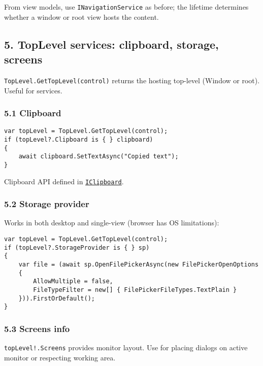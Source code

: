 From view models, use \passthrough{\lstinline!INavigationService!} as
before; the lifetime determines whether a window or root view hosts the
content.

\subsection{5. TopLevel services: clipboard, storage,
screens}\label{toplevel-services-clipboard-storage-screens}

\passthrough{\lstinline!TopLevel.GetTopLevel(control)!} returns the
hosting top-level (Window or root). Useful for services.

\subsubsection{5.1 Clipboard}\label{clipboard}

\begin{lstlisting}
var topLevel = TopLevel.GetTopLevel(control);
if (topLevel?.Clipboard is { } clipboard)
{
    await clipboard.SetTextAsync("Copied text");
}
\end{lstlisting}

Clipboard API defined in
\href{https://github.com/AvaloniaUI/Avalonia/blob/master/src/Avalonia.Base/Input/Platform/IClipboard.cs}{\passthrough{\lstinline!IClipboard!}}.

\subsubsection{5.2 Storage provider}\label{storage-provider}

Works in both desktop and single-view (browser has OS limitations):

\begin{lstlisting}
var topLevel = TopLevel.GetTopLevel(control);
if (topLevel?.StorageProvider is { } sp)
{
    var file = (await sp.OpenFilePickerAsync(new FilePickerOpenOptions
    {
        AllowMultiple = false,
        FileTypeFilter = new[] { FilePickerFileTypes.TextPlain }
    })).FirstOrDefault();
}
\end{lstlisting}

\subsubsection{5.3 Screens info}\label{screens-info}

\passthrough{\lstinline"topLevel!.Screens"} provides monitor layout. Use
for placing dialogs on active monitor or respecting working area.

